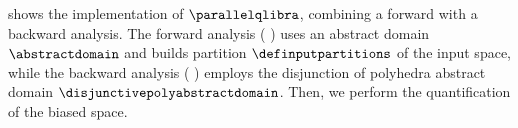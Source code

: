 { %
\newcommand\F{\textup{F}}
\newcommand\E{\textup{E}}
\newcommand\C{\textup{C}}
\renewcommand\B{\textup{B}}
\newcommand\I{\textup{I}}
\renewcommand\a{\defabstractvalue}
\newcommand\p{\defabstractactivationpattern}
\renewcommand\O{\textup{O}}
\renewcommand\o{\textup{o}}
\renewcommand\j{\textit{j}}



 shows the implementation of $\parallelqlibra$, combining a forward with a backward analysis.
The forward analysis (\cf{} ) uses an abstract domain $\abstractdomain$ and builds partition $\definputpartitions$ of the input space, while the backward analysis (\cf{} ) employs the disjunction of polyhedra abstract domain $\disjunctivepolyabstractdomain$.
Then, we perform the quantification of the biased space.

}
